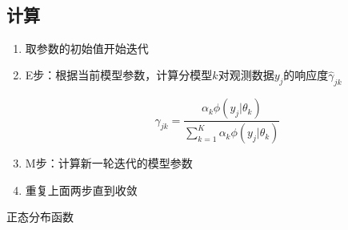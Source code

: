 \documentclass[11pt]{article}
\begin{document}
    \begin{center}
    \end{center}
    { \hspace*{\fill} \\}
    
    \hypertarget{ux8ba1ux7b97}{%
\subsection{计算}\label{ux8ba1ux7b97}}

\begin{enumerate}
\def\labelenumi{\arabic{enumi}.}
\item
  取参数的初始值开始迭代
\item
  E步：根据当前模型参数，计算分模型\(k\)对观测数据\(y_j\)的响应度\(\hat\gamma_{jk}\)

  \[ \hat\gamma_{jk} = \frac{\alpha_k \phi(y_j|\theta_k)}{\sum_{k=1}^K \alpha_k \phi(y_j|\theta_k)} \]
\item
  M步：计算新一轮迭代的模型参数
\item
  重复上面两步直到收敛
\end{enumerate}

    正态分布函数
\end{document}
